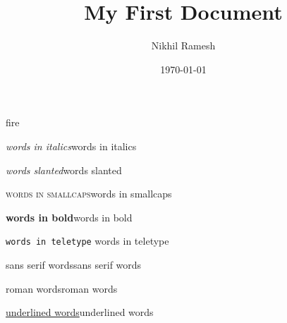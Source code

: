 \documentclass[a4paper,12pt]{article}
\begin{document}
{\color{red}fire}
\title{My First Document}
\author{Nikhil Ramesh}
\date{\today}
\maketitle

\textit{words in italics}words in italics

\textsl{words slanted}words slanted

\textsc{words in smallcaps}words in smallcaps

\textbf{words in bold}words in bold

\texttt{words in teletype}    words in teletype

\textsf{sans serif words}sans serif words

\textrm{roman words}roman words

\underline{underlined words}underlined words
\end{document}
